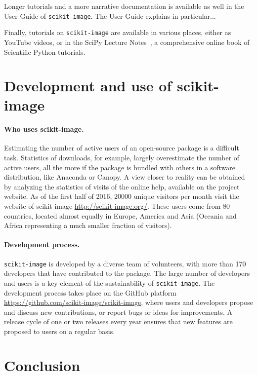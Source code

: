 \documentclass[twocolumn]{bmcart}%
\begin{document}
Longer tutorials and a more narrative documentation is available as well
in the User Guide of \texttt{scikit-image}. The User Guide explains in
particular...

Finally, tutorials on \texttt{scikit-image} are available in various
places, either as YouTube videos, or in the SciPy Lecture
Notes~\citep{scipylecturenotes}, a comprehensive online book of Scientific
Python tutorials.  

\section*{Development and use of scikit-image}

\paragraph{Who uses scikit-image.}

Estimating the number of active users of an open-source package is a
difficult task. Statistics of downloads, for example, largely
overestimate the number of active users, all the more if the package is
bundled with others in a software distribution, like Anaconda or Canopy.
A view closer to reality can be obtained by analyzing the statistics of
visits of the online help, available on the project website.  As of the
first half of 2016, 20000 unique visitors per month visit the website of
scikit-image \url{http://scikit-image.org/}. These users come from 80
countries, located almost equally in Europe, America and Asia (Oceania
and Africa representing a much smaller fraction of visitors).

\paragraph{Development process.}

\texttt{scikit-image} is developed by a diverse team of volunteers, with
more than 170 developers that have contributed to the package. The large
number of developers and users is a key element of the sustainability of
\texttt{scikit-image}. The
development process takes place on the GitHub platform
\url{https://github.com/scikit-image/scikit-image}, where users and
developers propose and discuss new contributions, or report bugs or ideas
for improvements.
A release cycle of one or two releases every year
ensures that new features are proposed to users on a regular basis.


\section*{Conclusion}
\end{document}
